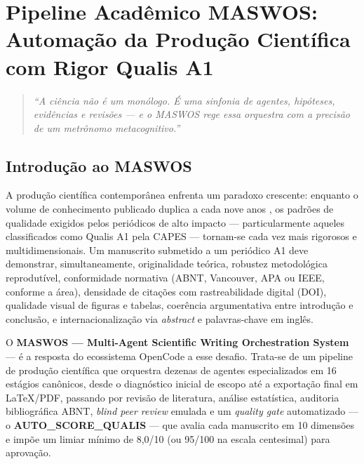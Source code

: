 
\chapter{Pipeline Acadêmico MASWOS: Automação da Produção Científica com Rigor Qualis A1}
\label{ch:maswos}

\begin{quote}
\textit{``A ciência não é um monólogo. É uma sinfonia de agentes,
hipóteses, evidências e revisões — e o MASWOS rege essa orquestra
com a precisão de um metrônomo metacognitivo.''}
\end{quote}

\section{Introdução ao MASWOS}
\label{sec:maswos_intro}

A produção científica contemporânea enfrenta um paradoxo
crescente: enquanto o volume de conhecimento publicado duplica a
cada nove anos \cite{Bornmann2015_Growth}, os padrões de qualidade
exigidos pelos periódicos de alto impacto — particularmente aqueles
classificados como Qualis A1 pela CAPES — tornam-se cada vez mais
rigorosos e multidimensionais. Um manuscrito submetido a um
periódico A1 deve demonstrar, simultaneamente, originalidade
teórica, robustez metodológica reprodutível, conformidade normativa
(ABNT, Vancouver, APA ou IEEE, conforme a área), densidade de
citações com rastreabilidade digital (DOI), qualidade visual de
figuras e tabelas, coerência argumentativa entre introdução e
conclusão, e internacionalização via \textit{abstract} e
palavras-chave em inglês.

O \textbf{MASWOS — Multi-Agent Scientific Writing Orchestration
System} — é a resposta do ecossistema OpenCode a esse desafio.
Trata-se de um pipeline de produção científica que orquestra
dezenas de agentes especializados em 16 estágios canônicos, desde o
diagnóstico inicial de escopo até a exportação final em LaTeX/PDF,
passando por revisão de literatura, análise estatística, auditoria
bibliográfica ABNT, \textit{blind peer review} emulada e um
\textit{quality gate} automatizado — o \textbf{AUTO\_SCORE\_QUALIS}
— que avalia cada manuscrito em 10 dimensões e impõe um limiar
mínimo de 8,0/10 (ou 95/100 na escala centesimal) para aprovação.

